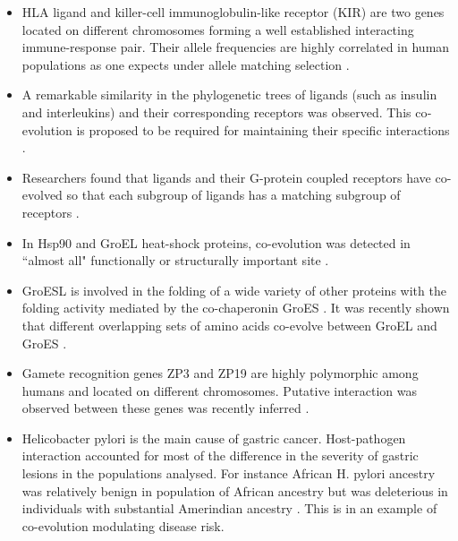 \begin{itemize}

\item HLA ligand and killer-cell immunoglobulin-like receptor (KIR) are two genes located on different chromosomes forming a well established interacting immune-response pair.
Their allele frequencies are highly correlated in human populations as one expects under allele matching selection \cite{single2007global}.

\item A remarkable similarity in the phylogenetic trees of ligands (such as insulin and interleukins) and their corresponding receptors was observed.
This co‐evolution is proposed to be required for maintaining their specific interactions \cite{pazos2001similarity}.

\item Researchers found that ligands and their G-protein coupled receptors have co-evolved so that each subgroup of ligands has a matching subgroup of receptors \cite{goh2000co}.

\item In Hsp90 and GroEL heat-shock proteins, co-evolution was detected in ``almost all" functionally or structurally important site \cite{fares2006novel}.

\item GroESL is involved in the folding of a wide variety of other proteins with the folding activity mediated by the co-chaperonin GroES  \cite{ruiz2013coevolution}.
It was recently shown that different overlapping sets of amino acids co-evolve between GroEL and GroES \cite{ruiz2013coevolution}.

\item Gamete recognition genes ZP3 and ZP19 are highly polymorphic among humans and located on different chromosomes.
Putative interaction was observed between these genes was recently inferred \cite{rohlfs2010detecting}.

\item Helicobacter pylori is the main cause of gastric cancer. 
Host-pathogen interaction accounted for most of the difference in the severity of gastric lesions in the populations analysed. 
For instance African H. pylori ancestry was relatively benign in population of African ancestry but was deleterious in individuals with substantial Amerindian ancestry \cite{kodaman2014human}.
This is in an example of co-evolution modulating disease risk.

\end{itemize}

